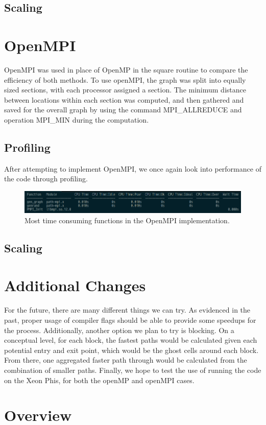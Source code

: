 \documentclass{article}
\begin{document}
\subsection{Scaling}

\section{OpenMPI}

OpenMPI was used in place of OpenMP in the square routine to compare the efficiency of both methods. To use openMPI, the graph was split into equally sized sections, with each processor assigned a section. The minimum distance between locations within each section was computed, and then gathered and saved for the overall graph by using the command MPI\_ALLREDUCE and operation MPI\_MIN during the computation.  

\subsection{Profiling}
After attempting to implement OpenMPI, we once again look into performance of the code through profiling. 
	\begin{figure}[h!]
		\begin{center}
			\includegraphics[width=0.7\columnwidth]{amplxe_mpi}
			\caption{Most time consuming functions in the OpenMPI implementation.}
			\label{amplxe_mpi}
		\end{center}
	\end{figure}

\subsection{Scaling}

\section{Additional Changes}
For the future, there are many different things we can try. As evidenced in the past, proper usage of compiler flags should be able to provide some speedups for the process. Additionally, another option we plan to try is blocking. On a conceptual level, for each block, the fastest paths would be calculated given each potential entry and exit point, which would be the ghost cells around each block. From there, one aggregated faster path through would be calculated from the combination of smaller paths. Finally, we hope to test the use of running the code on the Xeon Phis, for both the openMP and openMPI cases.

\section{Overview}

\begin{thebibliography}{1}

\end{thebibliography}
\end{document}
